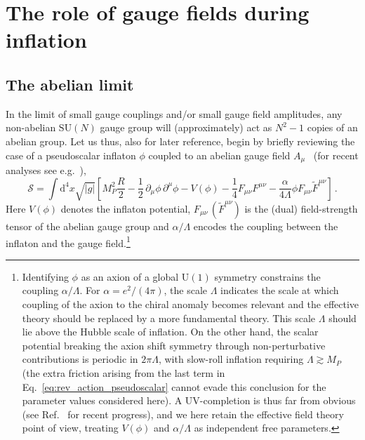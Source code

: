 
\section{The role of gauge fields during inflation \label{sec:axioninflation}}

\subsection{The abelian limit \label{sec:abelian}}

In the limit of small gauge couplings and/or small gauge field amplitudes, any non-abelian $\mathrm{SU}(N)$ gauge group will (approximately) act as $N^2 - 1$ copies of an abelian group. Let us thus, also for later reference, begin by briefly reviewing the case of a pseudoscalar inflaton $\phi$ coupled to an abelian gauge field $A_\mu$~\cite{Turner:1987bw,Garretson:1992vt,Anber:2006xt} (for recent analyses see e.g.\ \cite{Barnaby:2010vf,Barnaby:2011qe,Domcke:2016bkh,Jimenez:2017cdr}),
\label{eq:rev_action_pseudoscalar}
\begin{equation}
\mathcal{S}= \int \textrm{d}^4 x \sqrt{|g|} \left[M_P^2 \frac{R}{2} -\frac{1}{2} \, \partial_\mu \phi \, \partial^\mu \phi - V(\phi) - \frac{1}{4} F_{\mu \nu} F^{\mu \nu} - \frac{\alpha}{4 \Lambda} \phi F_{\mu \nu} \tilde{F}^{\mu \nu} \right ]\, .
\end{equation}
Here $V(\phi)$ denotes the inflaton potential, $F_{\mu \nu} \, (\tilde F^{\mu \nu})$ is the (dual) field-strength tensor of the abelian gauge group and $\alpha/\Lambda$ encodes the coupling between the inflaton and the gauge field.\footnote{Identifying $\phi$ as an axion of a global $\mathrm{U}(1)$ symmetry constrains the coupling $\alpha/\Lambda$. For $\alpha = e^2/(4 \pi)$, the scale $\Lambda$ indicates the scale at which coupling of the axion to the chiral anomaly becomes relevant and the effective theory should be replaced by a more fundamental theory. This scale $\Lambda$ should lie above the Hubble scale of inflation. On the other hand, the scalar potential breaking the axion shift symmetry through non-perturbative contributions is periodic in $2 \pi \Lambda$, with slow-roll inflation requiring $\Lambda \gtrsim M_P$ (the extra friction arising from the last term in Eq.~\eqref{eq:rev_action_pseudoscalar} cannot evade this conclusion for the parameter values considered here). A UV-completion is thus far from obvious (see Ref.~\cite{Agrawal:2018mkd} for recent progress), and we here retain the effective field theory point of view, treating $V(\phi)$ and $\alpha/\Lambda$ as independent free parameters.}



